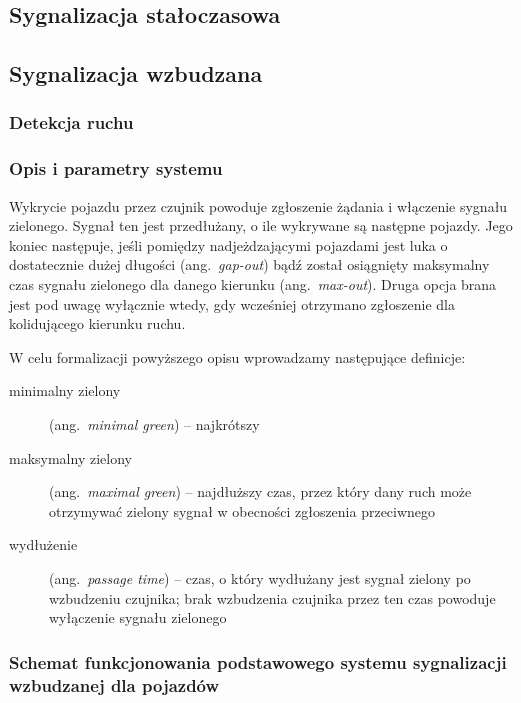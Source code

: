 \documentclass{pracamgr}
\newcommand{\ang}[1]{(ang.~\emph{#1})}
\begin{document}
\subsection{Sygnalizacja stałoczasowa}
\subsection{Sygnalizacja wzbudzana}

\subsubsection{Detekcja ruchu}
\label{ss:detekcja}

\subsubsection{Opis i parametry systemu}
\label{sec:opis-parametry}
Wykrycie pojazdu przez czujnik powoduje zgłoszenie żądania i włączenie
sygnału zielonego. Sygnał ten jest przedłużany, o ile wykrywane są
następne pojazdy. Jego koniec następuje, jeśli pomiędzy
nadjeżdzającymi pojazdami jest luka o dostatecznie dużej długości
\ang{\mbox{gap-out}} bądź został osiągnięty maksymalny czas sygnału zielonego
dla danego kierunku \ang{\mbox{max-out}}. Druga opcja brana jest pod uwagę
wyłącznie wtedy, gdy wcześniej otrzymano zgłoszenie dla kolidującego
kierunku ruchu.

W celu formalizacji powyższego opisu wprowadzamy następujące definicje:%
\begin{description}
  \item[minimalny zielony] \ang{minimal green} -- najkrótszy
  \item[maksymalny zielony] \ang{maximal green} -- najdłuższy czas,
  przez który dany ruch może otrzymywać zielony sygnał w obecności
  zgłoszenia przeciwnego
  \item[wydłużenie] \ang{passage time} -- czas, o który wydłużany jest
  sygnał zielony po wzbudzeniu czujnika; brak wzbudzenia czujnika
  przez ten czas powoduje wyłączenie sygnału zielonego
\end{description}

\subsubsection{Schemat funkcjonowania podstawowego systemu sygnalizacji wzbudzanej dla pojazdów}
\label{ss:wzbudzana-schemat}
\end{document}
